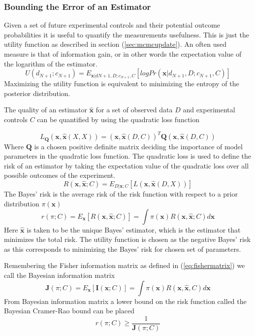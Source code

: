 \subsubsection{Bounding the Error of an Estimator}
Given a set of future experimental controls and their potential outcome probabilities it is useful to quantify the measurements usefulness. This is just the utility function as described in section (\ref{sec:mcmcupdate}). An often used measure is that of information gain, or in other words the expectation value of the logarithm of the estimator. 
\begin{equation}
U(d_{N+1};c_{N+1}) = E_{\mathbf{x}|d{N+1},D;c_{N+1},C}[log Pr(\mathbf{x}|d_{N+1},D;c_{N+1},C)]
\label{eq:utilityfunction}
\end{equation}
Maximizing the utility function is equivalent to minimizing the entropy of the posterior distribution.

The quality of an estimator $\mathbf{\hat{x}}$ for a set of observed data $D$ and experimental controls $C$ can be quantified by using the quadratic loss function 

\begin{equation}
L_{\mathbf{Q}}(\mathbf{x},\mathbf{\hat{x}}(X,X)) = (\mathbf{x},\mathbf{\hat{x}}(D,C))^T\mathbf{Q}(\mathbf{x},\mathbf{\hat{x}}(D,C))
\label{eq:quadraticloss}
\end{equation}
Where $\mathbf{Q}$ is a chosen positive definite matrix deciding the importance of model parameters in the quadratic loss function. The quadratic loss is used to define the risk of an estimator by taking the expectation value of the quadratic loss over all possible outcomes of the experiment.
\begin{equation}
R(\mathbf{x},\mathbf{\hat{x}};C) = E_{D|\mathbf{x};C}[L(\mathbf{x},\mathbf{\hat{x}}(D,X))]
\label{eq:risk}
\end{equation}
The Bayes' risk is the average risk of the risk function with respect to a prior distribution $\pi(\mathbf{x})$
\begin{equation}
r(\pi;C) = E_\mathbf{x}[R(\mathbf{x},\mathbf{\hat{x}};C)] = \int \pi(\mathbf{x})R(\mathbf{x},\mathbf{\hat{x}};C)d\mathbf{x}
\label{eq:bayesrisk}
\end{equation}
Here $\mathbf{\hat{x}}$ is taken to be the unique Bayes' estimator, which is the estimator that minimizes the total risk. The utility function is chosen as the negative Bayes' risk as this corresponds to minimizing the Bayes' risk for chosen set of parameters. 
 
Remembering the Fisher information matrix as defined in (\ref{eq:fishermatrix}) we call the Bayesian information matrix\cite{bayesiancramer}
\begin{equation}
\mathbf{J}(\pi;C) = E_\mathbf{x}[\mathbf{I}(\mathbf{x};C)] = \int \pi(\mathbf{x})R(\mathbf{x},\mathbf{\hat{x}},C)d\mathbf{x}
\label{eq:bayesianinformation}
\end{equation}
From Bayesian information matrix a lower bound on the risk function called the Bayesian Cramer-Rao bound can be placed \cite{bcrb}
\begin{equation}
\label{eq:bayeslowerbound}
r(\pi;C)\geq \frac{1}{\mathbf{J}(\pi;C)}
\end{equation}

